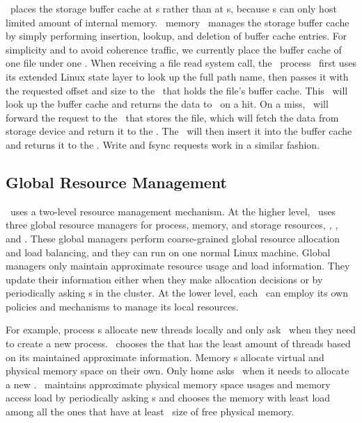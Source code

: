 \documentclass[10pt,times,twocolumn]{z2-article}
\begin{document}
{{{{{{{\lego\ places the storage buffer cache at \mcomponent{}s
rather than at \scomponent{}s, because \scomponent{}s can only host limited amount of internal memory.
\lego\ memory \microos\ manages the storage buffer cache by simply performing insertion, lookup, and deletion of buffer cache entries.
For simplicity and to avoid coherence traffic, we currently place the buffer cache of one file
under one \mcomponent{}.
When receiving a file read system call, the \lego\ process \microos\ first uses its extended Linux state layer to 
look up the full path name, then passes it with the requested offset and size to the \mcomponent\ that holds the file's buffer cache.
This \mcomponent\ will look up the buffer cache and returns the data to \pcomponent\ on a hit.
On a miss, \mcomponent\ will forward the request to the \scomponent\ that stores the file, 
which will fetch the data from storage device and return it to the \mcomponent.
The \mcomponent\ will then insert it into the buffer cache and returns it to the \pcomponent.
Write and fsync requests work in a similar fashion.

\subsection{Global Resource Management}
\label{sec:grm}
\lego\ uses a two-level resource management mechanism.
At the higher level, \lego\ uses three global resource managers for process, memory, and storage resources, 
{\em \gpm, \gmm}, and {\em \gsm}.
These global managers perform coarse-grained global resource allocation and load balancing,
and they can run on one normal Linux machine.
Global managers only maintain approximate resource usage and load information.
They update their information either when they make allocation decisions 
or by periodically asking \microos{}s in the cluster.
At the lower level, each \microos\ can employ its own policies and mechanisms to manage its local resources.

For example, process \microos{}s allocate new threads locally 
and only ask \gpm\ when they need to create a new process.
\gpm\ chooses the \pcomponent{} that has the least amount of threads based on its maintained approximate information.
Memory \microos{}s allocate virtual and physical memory space on their own.
Only home \mcomponent{} asks \gmm\ when it needs to allocate a new \vregion.
\gmm\ maintains approximate physical memory space usages and memory access load by periodically asking \mcomponent{}s
and chooses the memory with least load among all the ones that have at least \vregion\ size of free physical memory.

}}}}}}}
\end{document}
